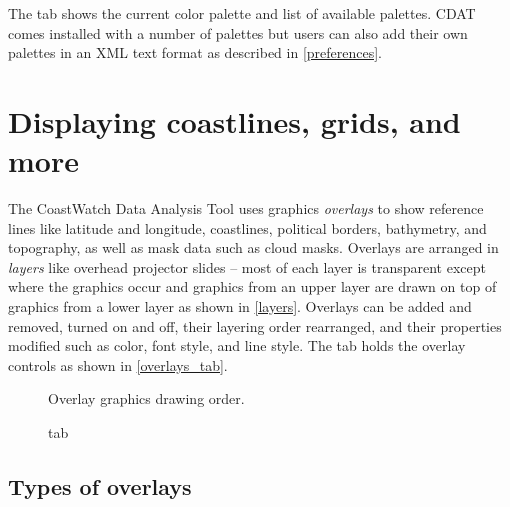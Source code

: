The  tab shows the current color
palette and list of available palettes.  CDAT comes installed
with a number of palettes but users can also add their own
palettes in an XML text format as described in
\autoref{preferences}.

\section{Displaying coastlines, grids, and more}

The CoastWatch Data Analysis Tool uses graphics {\em overlays} to
show reference lines like latitude and longitude, coastlines,
political borders, bathymetry, and topography, as well as mask
data such as cloud masks.  Overlays are arranged in {\em layers}
like overhead projector slides -- most of each layer is
transparent except where the graphics occur and graphics from an
upper layer are drawn on top of graphics from a lower layer as
shown in \autoref{layers}.  Overlays can be added and removed,
turned on and off, their layering order rearranged, and their
properties modified such as color, font style, and line style.
The  tab holds the overlay
controls as shown in \autoref{overlays_tab}.

\begin{figure}
  \begin{center}
    \caption[Overlay graphics drawing order]{
       Overlay graphics drawing order.
    }
    \label{layers}
  \end{center}
\end{figure}

\begin{figure}
  \begin{center}
    \caption[Overlay Layers tab]{
        tab
    }
    \label{overlays_tab}
  \end{center}
\end{figure}

\subsection{Types of overlays}

